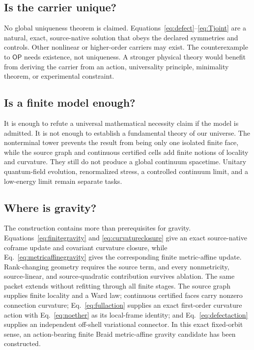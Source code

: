 \documentclass[11pt]{article}
\theoremstyle{definition}
\theoremstyle{remark}
\newcommand{\OPT}{\mathsf{OP}}
\begin{document}
\subsection{Is the carrier unique?}

No global uniqueness theorem is claimed. Equations~\eqref{eq:defect}--\eqref{eq:Tjoint} are a natural, exact, source-native solution that obeys the declared symmetries and controls. Other nonlinear or higher-order carriers may exist. The counterexample to $\OPT$ needs existence, not uniqueness. A stronger physical theory would benefit from deriving the carrier from an action, universality principle, minimality theorem, or experimental constraint.

\subsection{Is a finite model enough?}

It is enough to refute a universal mathematical necessity claim if the model is admitted. It is not enough to establish a fundamental theory of our universe. The nonterminal tower prevents the result from being only one isolated finite face, while the source graph and continuous certified cells add finite notions of locality and curvature. They still do not produce a global continuum spacetime. Unitary quantum-field evolution, renormalized stress, a controlled continuum limit, and a low-energy limit remain separate tasks.

\subsection{Where is gravity?}

The construction contains more than prerequisites for gravity. Equations~\eqref{eq:finitegravity} and \eqref{eq:curvatureclosure} give an exact source-native coframe update and covariant curvature closure, while Eq.~\eqref{eq:metricaffinegravity} gives the corresponding finite metric-affine update. Rank-changing geometry requires the source term, and every nonmetricity, source-linear, and source-quadratic contribution survives ablation. The same packet extends without refitting through all finite stages. The source graph supplies finite locality and a Ward law; continuous certified faces carry nonzero connection curvature; Eq.~\eqref{eq:fullaction} supplies an exact first-order curvature action with Eq.~\eqref{eq:noether} as its local-frame identity; and Eq.~\eqref{eq:defectaction} supplies an independent off-shell variational connector. In this exact fixed-orbit sense, an action-bearing finite Braid metric-affine gravity candidate has been constructed.
\end{document}
